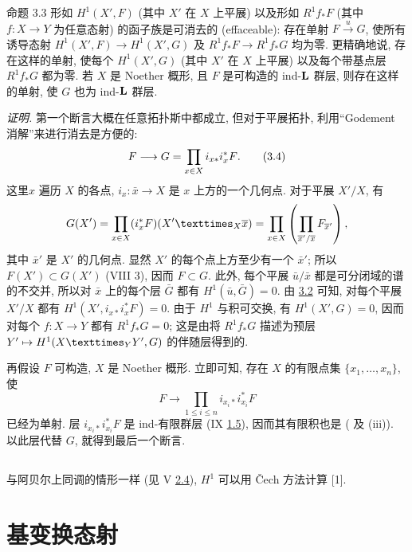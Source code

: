 \begin{enonce*}{命题 3.3}
形如 $H^1(X',F)$ (其中 $X'$ 在 $X$ 上平展) 以及形如 $R^1f_*F$ (其中 $f:X\to Y$ 为任意态射) 的函子族是可消去的 (effaceable): 存在单射 $F\xrightarrow{u}G$, 使所有诱导态射 $H^1(X',F)\to H^1(X',G)$ 及 $R^1f_*F\to R^1f_*G$ 均为零. 更精确地说, 存在这样的单射, 使每个 $H^1(X',G)$ (其中 $X'$ 在 $X$ 上平展) 以及每个带基点层 $R^1f_*G$ 都为零. 若 $X$ 是 Noether 概形, 且 $F$ 是可构造的 ind-$\mathbf{L}$ 群层, 则存在这样的单射, 使 $G$ 也为 ind-$\mathbf{L}$ 群层.
\end{enonce*}

\emph{证明.} 第一个断言大概在任意拓扑斯中都成立, 但对于平展拓扑, 利用“Godement 消解”来进行消去是方便的:
\begin{equation*}
F\longrightarrow G=\prod_{x\in X}i_{x*}i_x^*F{}.
\tag{3.4}
\end{equation*}
这里\pageoriginale $x$ 遍历 $X$ 的各点, $i_x:\bar x\to X$ 是 $x$ 上方的一个几何点. 对于平展 $X'/X$, 有
$$
G(X')=\prod_{x\in X}(i_x^*F)(\fprod{X'}{\bar x}{X})
=\prod_{x\in X}\left(\prod_{\bar x'/\bar x}F_{\bar x'}\right){\quoi},
$$
其中 $\bar x'$ 是 $X'$ 的几何点. 显然 $X'$ 的每个点上方至少有一个 $\bar x'$; 所以 $F(X')\subset G(X')$ (VIII 3), 因而 $F\subset G$. 此外, 每个平展 $\bar u/\bar x$ 都是可分闭域的谱的不交并, 所以对 $\bar x$ 上的每个层 $\bar G$ 都有 $H^1(\bar u,\bar G)=0$. 由 \hyperref[XII.prop3.2]{3.2} 可知, 对每个平展 $X'/X$ 都有 $H^1(X',i_{x*}i_x^*F)=0$. 由于 $H^1$ 与积可交换, 有 $H^1(X',G)=0$, 因而对每个 $f:X\to Y$ 都有 $R^1f_*G=0$; 这是由将 $R^1f_*G$ 描述为预层 $Y'\mapsto H^1(\fprod{X}{Y'}{Y},G)$ 的伴随层得到的.

再假设 $F$ 可构造, $X$ 是 Noether 概形. 立即可知, 存在 $X$ 的有限点集 $\{x_1,\ldots,x_n\}$, 使
$$
F\longrightarrow\prod_{1\leq i\leq n}i_{x_i*}i_{x_i}^*F
$$
已经为单射. 层 $i_{x_i*}i_{x_i}^*F$ 是 ind-有限群层 (IX \hyperref[IX.def1.5]{1.5}), 因而其有限积也是 ( 及  (iii)). 以此层代替 $G$, 就得到最后一个断言.

\setcounter{subsection}{4}
\subsection{}
与阿贝尔上同调的情形一样 (见 V \hyperref[V.subsec2.4]{2.4}), $H^1$ 可以用 \v{C}ech 方法计算 [1].

\section{基变换态射}\pageoriginale

